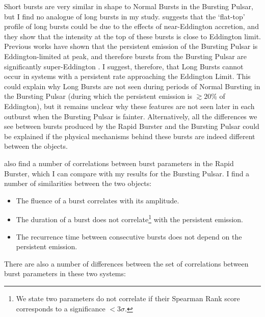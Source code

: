 \par Short bursts are very similar in shape to Normal Bursts in the Bursting Pulsar, but I find no analogue of long bursts in my study.  \citet{Bagnoli_PopStudy} suggests that the `flat-top' profile of long bursts could be due to the effects of near-Eddington accretion, and they show that the intensity at the top of these bursts is close to Eddington limit.  Previous works have shown that the persistent emission of the Bursting Pulsar is Eddington-limited at peak, and therefore bursts from the Bursting Pulsar are significantly super-Eddington \citep{Sazonov_BPGranat}.   I suggest, therefore, that Long Bursts cannot occur in systems with a persistent rate approaching the Eddington Limit.  This could explain why Long Bursts are not seen during periods of Normal Bursting in the Bursting Pulsar (during which the persistent emission is $\gtrsim{20}$\% of Eddington), but it remains unclear why these features are not seen later in each outburst when the Bursting Pulsar is fainter.  Alternatively, all the differences we see between bursts produced by the Rapid Burster and the Bursting Pulsar could be explained if the physical mechanisms behind these bursts are indeed different between the objects.
\par \citet{Bagnoli_PopStudy} also find a number of correlations between burst parameters in the Rapid Burster, which I can compare with my results for the Bursting Pulsar.  I find a number of similarities between the two objects:

\begin{itemize}
\item The fluence of a burst correlates with its amplitude.
\item The duration of a burst does not correlate\footnote{We state two parameters do not correlate if their Spearman Rank score corresponds to a significance $<3\sigma$.} with the persistent emission.
\item The recurrence time between consecutive bursts does not depend on the persistent emission.
 \end{itemize}

\par There are also a number of differences between the set of correlations between burst parameters in these two systems:

